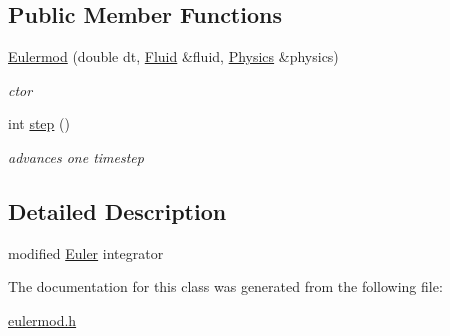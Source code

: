 \subsection*{\-Public \-Member \-Functions}
\begin{DoxyCompactItemize}
\item 
\hypertarget{classEulermod_a60dfcac405d5024f76baa9f4cf037a18}{\hyperlink{classEulermod_a60dfcac405d5024f76baa9f4cf037a18}{\-Eulermod} (double dt, \hyperlink{classFluid}{\-Fluid} \&fluid, \hyperlink{classPhysics}{\-Physics} \&physics)}\label{classEulermod_a60dfcac405d5024f76baa9f4cf037a18}

\begin{DoxyCompactList}\small\item\em ctor \end{DoxyCompactList}\item 
\hypertarget{classEulermod_aa47d39f3d649484b159ecdd4b6d88ff2}{int \hyperlink{classEulermod_aa47d39f3d649484b159ecdd4b6d88ff2}{step} ()}\label{classEulermod_aa47d39f3d649484b159ecdd4b6d88ff2}

\begin{DoxyCompactList}\small\item\em advances one timestep \end{DoxyCompactList}\end{DoxyCompactItemize}


\subsection{\-Detailed \-Description}
modified \hyperlink{classEuler}{\-Euler} integrator 

\-The documentation for this class was generated from the following file\-:\begin{DoxyCompactItemize}
\item 
\hyperlink{eulermod_8h}{eulermod.\-h}\end{DoxyCompactItemize}
